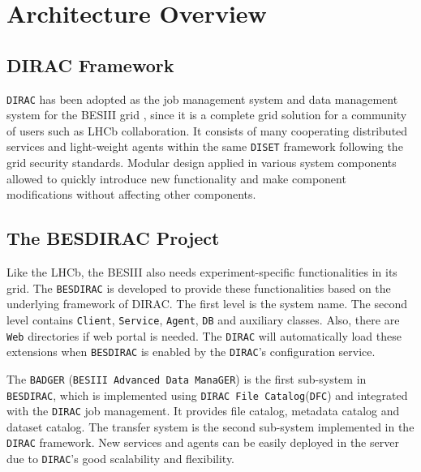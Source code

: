 \section{Architecture Overview}

\subsection{DIRAC Framework}

{\tt DIRAC} \cite{bib:dirac3,bib:diracgit} 
has been adopted as the job management system and data management
system for the BESIII grid \cite{bib:besdfc}, since 
it is a complete grid solution for a community of users such as
LHCb collaboration.
It consists of many cooperating distributed services and light-weight
agents within the same {\tt DISET} framework following the grid
security standards.
Modular design applied in various system components allowed to quickly
introduce new functionality and make component modifications without
affecting other components.

\subsection{The BESDIRAC Project}

Like the LHCb, the BESIII also needs experiment-specific 
functionalities in its grid.
The {\tt BESDIRAC} \cite{bib:besdirac} 
is developed to provide these functionalities
based on the underlying framework of DIRAC.
The first level is the system name. The second level contains
{\tt Client}, {\tt Service}, {\tt Agent}, {\tt DB} and auxiliary classes.
Also, there are {\tt Web} directories if web portal is needed.
The {\tt DIRAC} will automatically load these extensions when 
{\tt BESDIRAC} is enabled by the {\tt DIRAC}'s configuration service.

The {\tt BADGER} (\verb"BESIII Advanced Data ManaGER") is the first sub-system
in {\tt BESDIRAC}, which is implemented using {\tt DIRAC File
Catalog}(\verb"DFC")
and integrated with the {\tt DIRAC} job management.
It provides file catalog, metadata catalog and dataset catalog.
%
The transfer system is the second sub-system implemented in the
{\tt DIRAC} framework. 
New services and agents can be easily deployed in the server
due to {\tt DIRAC}'s good scalability and flexibility.

